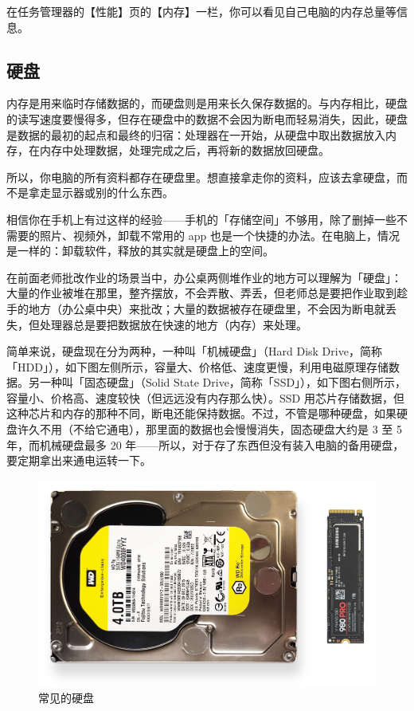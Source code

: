 在任务管理器的【性能】页的【内存】一栏，你可以看见自己电脑的内存总量等信息。

\subsection{硬盘}

内存是用来临时存储数据的，而硬盘则是用来长久保存数据的。与内存相比，硬盘的读写速度要慢得多，但存在硬盘中的数据不会因为断电而轻易消失，因此，硬盘是数据的最初的起点和最终的归宿：处理器在一开始，从硬盘中取出数据放入内存，在内存中处理数据，处理完成之后，再将新的数据放回硬盘。

\begin{note}
  所以，你电脑的所有资料都存在硬盘里。想直接拿走你的资料，应该去拿硬盘，而不是拿走显示器或别的什么东西。
\end{note}

相信你在手机上有过这样的经验——手机的「存储空间」不够用，除了删掉一些不需要的照片、视频外，卸载不常用的 app 也是一个快捷的办法。在电脑上，情况是一样的：卸载软件，释放的其实就是硬盘上的空间。

在前面老师批改作业的场景当中，办公桌两侧堆作业的地方可以理解为「硬盘」：大量的作业被堆在那里，整齐摆放，不会弄散、弄丢，但老师总是要把作业取到趁手的地方（办公桌中央）来批改；大量的数据被存在硬盘里，不会因为断电就丢失，但处理器总是要把数据放在快速的地方（内存）来处理。

简单来说，硬盘现在分为两种，一种叫「机械硬盘」（Hard Disk Drive，简称「HDD」），如下图左侧所示，容量大、价格低、速度更慢，利用电磁原理存储数据。另一种叫「固态硬盘」（Solid State Drive，简称「SSD」），如下图右侧所示，容量小、价格高、速度较快（但远远没有内存那么快）。SSD 用芯片存储数据，但这种芯片和内存的那种不同，断电还能保持数据。不过，不管是哪种硬盘，如果硬盘许久不用（不给它通电），那里面的数据也会慢慢消失，固态硬盘大约是 3 至 5 年，而机械硬盘最多 20 年——所以，对于存了东西但没有装入电脑的备用硬盘，要定期拿出来通电运转一下。

\begin{figure}[htb!]
  \centering
  \includegraphics[width=.7\textwidth]{assets/basic/HDD_and_SSD.png}
  \caption{常见的硬盘}
  \label{fig:HDD_and_SSD}
\end{figure}

